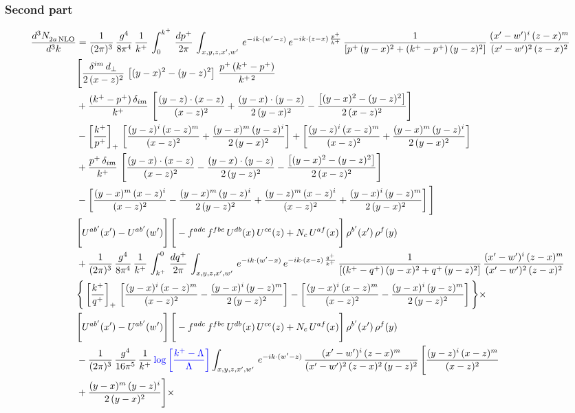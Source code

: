 \documentclass[9pt]{article}
\numberwithin{equation}{section}
\begin{document}
\subsubsection*{Second part}
\begin{align}
    \frac{d^{3}N_{2a\,\rm NLO}^{\rm}}{d^{3}k}  & =  \frac{1}{(2\pi)^{3}}\, \frac{g^{4}}{8\pi^{4}}\,\frac{1}{k^{+}}\,\int_{0}^{k^{+}}\, \frac{dp^{+}}{2\pi}\,\int_{x,y,z,x',w'}\, e^{-ik\cdot(w'-z)}\,e^{-ik\cdot (z-x)\,\frac{p^{+}}{k^{+}}}\,\frac{1}{\left[p^{+}\,(y-x)^{2}+(k^{+}-p^{+})\,(y-z)^{2}\right]}\, \frac{(x'-w')^{i}\,(z-x)^{m}}{(x'-w')^{2}\,(z-x)^{2}} \notag \\ & \Bigg[\frac{\delta^{im}\,d_{\perp}}{2\,(x-z)^{2}}\,\left[(y-x)^{2}-(y-z)^{2}\right]\,\frac{p^{+}\,(k^{+}-p^{+})}{k^{+\,2}}\notag \\ & +\frac{(k^{+}-p^{+})\,\delta_{im}}{k^{+}}\,\left[\frac{(y-z)\cdot (x-z)}{(x-z)^{2}}+\frac{(y-x)\cdot (y-z)}{2\,(y-x)^{2}}-\frac{\left[(y-x)^{2}-(y-z)^{2}\right]}{2\,(x-z)^{2}}\right]\notag \\ & -\left[\frac{k^{+}}{p^{+}}\right]_{+}\,\left[\frac{(y-z)^{i}\,(x-z)^{m}}{(x-z)^{2}}+\frac{(y-x)^{m}\,(y-z)^{i}}{2\,(y-x)^{2}}\right]+ \left[\frac{(y-z)^{i}\,(x-z)^{m}}{(x-z)^{2}}+\frac{(y-x)^{m}\,(y-z)^{i}}{2\,(y-x)^{2}}\right]\notag \\ & +\frac{p^{+}\,\delta_{im}}{k^{+}}\,\left[\frac{(y-x)\cdot (x-z)}{(x-z)^{2}}-\frac{(y-x)\cdot (y-z)}{2\,(y-z)^{2}}-\frac{\left[(y-x)^{2}-(y-z)^{2}\right]}{2\,(x-z)^{2}}\right]\notag \\ &-\left[\frac{(y-x)^{m}\,(x-z)^{i}}{(x-z)^{2}}-\frac{(y-x)^{m}\,(y-z)^{i}}{2\,(y-z)^{2}}+\frac{(y-z)^{m}\,(x-z)^{i}}{(x-z)^{2}}+\frac{(y-x)^{i}\,(y-z)^{m}}{2\,(y-x)^{2}}\right]\Bigg] \notag \\ & \Bigg[U^{ab'}(x')-U^{ab'}(w')\Bigg]\,\Bigg[-f^{adc}\,f^{fbe}\,U^{db}(x)\,U^{ce}(z)+N_{c}\,U^{af}(x)\Bigg]\,\rho^{b'}(x')\,\rho^{f}(y)\notag \\ & + \frac{1}{(2\pi)^{3}}\,\frac{g^{4}}{8\pi^{4}}\,\frac{1}{k^{+}}\, \int^{0}_{k^{+}}\, \frac{dq^{+}}{2\pi} \,  \int_{x,y,z,x',w'}\,e^{-ik\cdot(w'-x)}\,e^{-ik\cdot (x-z)\,\frac{q^{+}}{k^{+}}}\,\frac{1}{\left[(k^{+}-q^{+})\,(y-x)^{2}+q^{+}\,(y-z)^{2}\right]}\, \frac{(x'-w')^{i}\,(z-x)^{m}}{(x'-w')^{2}\,(z-x)^{2}} \notag \\ &\Bigg\{\left[\frac{k^{+}}{q^{+}}\right]_{+}\,\left[\frac{(y-x)^{i}\,(x-z)^{m}}{(x-z)^{2}}-\frac{(y-x)^{i}\,(y-z)^{m}}{2\,(y-z)^{2}}\right] -\left[\frac{(y-x)^{i}\,(x-z)^{m}}{(x-z)^{2}}-\frac{(y-x)^{i}\,(y-z)^{m}}{2\,(y-z)^{2}}\right]\Bigg\}\times\,\notag \\ & \Bigg[U^{ab'}(x')-U^{ab'}(w')\Bigg]\,\Bigg[-f^{adc}\,f^{fbe}\,U^{db}(x)\,U^{ce}(z)+N_{c}\,U^{af}(x)\Bigg]\,\rho^{b'}(x')\,\rho^{f}(y)\notag \\ & - \frac{1}{(2\pi)^{3}}\, \frac{g^{4}}{16\pi^{5}}\,\frac{1}{k^{+}}\,{\color{blue}\log{\left[\frac{k^{+}-\Lambda}{\Lambda}\right]}} \int_{x,y,z,x',w'}\,e^{-ik\cdot(w'-z)}\, \frac{(x'-w')^{i}\,(z-x)^{m}}{(x'-w')^{2}\,(z-x)^{2}\, (y-z)^{2}}\,\Bigg[\frac{(y-z)^{i}\,(x-z)^{m}}{(x-z)^{2}}\notag \\ & +\frac{(y-x)^{m}\,(y-z)^{i}}{2\,(y-x)^{2}}\Bigg]\times\, 
\end{align}
\end{document}
